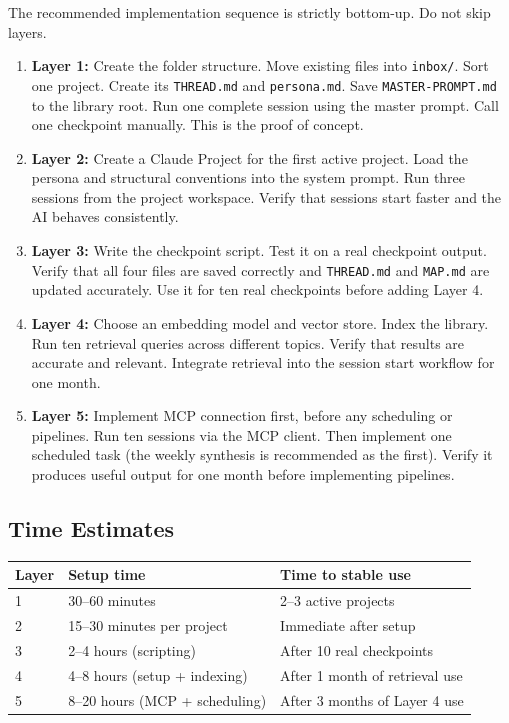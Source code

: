 \documentclass[12pt,letterpaper]{article}
\begin{document}
The recommended implementation sequence is strictly bottom-up.
Do not skip layers.

\begin{enumerate}
  \item \textbf{Layer 1:} Create the folder structure. Move existing
        files into \texttt{inbox/}. Sort one project. Create its
        \texttt{THREAD.md} and \texttt{persona.md}. Save
        \texttt{MASTER-PROMPT.md} to the library root. Run one
        complete session using the master prompt. Call one checkpoint
        manually. This is the proof of concept.

  \item \textbf{Layer 2:} Create a Claude Project for the first
        active project. Load the persona and structural conventions
        into the system prompt. Run three sessions from the project
        workspace. Verify that sessions start faster and the AI
        behaves consistently.

  \item \textbf{Layer 3:} Write the checkpoint script. Test it on
        a real checkpoint output. Verify that all four files are
        saved correctly and \texttt{THREAD.md} and \texttt{MAP.md}
        are updated accurately. Use it for ten real checkpoints
        before adding Layer 4.

  \item \textbf{Layer 4:} Choose an embedding model and vector store.
        Index the library. Run ten retrieval queries across different
        topics. Verify that results are accurate and relevant. Integrate
        retrieval into the session start workflow for one month.

  \item \textbf{Layer 5:} Implement MCP connection first, before any
        scheduling or pipelines. Run ten sessions via the MCP client.
        Then implement one scheduled task (the weekly synthesis is
        recommended as the first). Verify it produces useful output
        for one month before implementing pipelines.
\end{enumerate}

\subsection{Time Estimates}

\begin{center}
\begin{tabular}{@{}lll@{}}
\toprule
\textbf{Layer} & \textbf{Setup time} & \textbf{Time to stable use} \\
\midrule
1 & 30--60 minutes & 2--3 active projects \\
2 & 15--30 minutes per project & Immediate after setup \\
3 & 2--4 hours (scripting) & After 10 real checkpoints \\
4 & 4--8 hours (setup + indexing) & After 1 month of retrieval use \\
5 & 8--20 hours (MCP + scheduling) & After 3 months of Layer 4 use \\
\bottomrule
\end{tabular}
\end{center}
\end{document}
